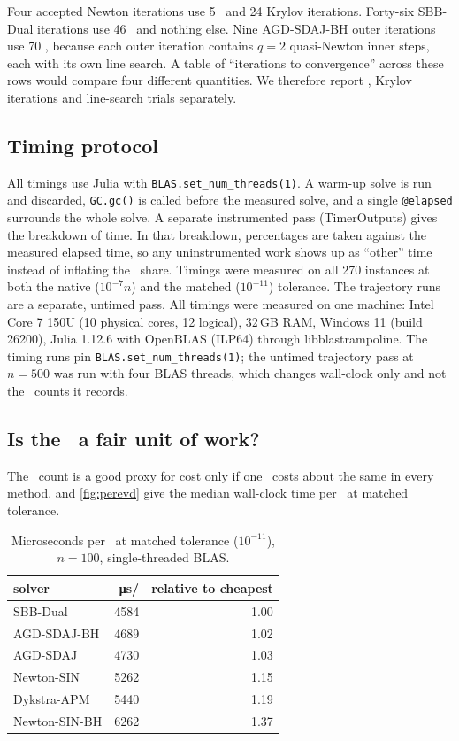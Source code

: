 Four accepted Newton iterations use 5 \EVDs\ and 24 Krylov iterations. Forty-six
SBB-Dual iterations use 46 \EVDs\ and nothing else. Nine AGD-SDAJ-BH outer
iterations use 70 \EVDs, because each outer iteration contains $q=2$
quasi-Newton inner steps, each with its own line search. A table of
``iterations to convergence'' across these rows would compare four
different quantities. We therefore report \EVDs, Krylov iterations and
line-search trials separately.

\subsection{Timing protocol}\label{sec:timing}
All timings use Julia with \texttt{BLAS.set\_num\_threads(1)}. A warm-up solve
is run and discarded, \texttt{GC.gc()} is called before the measured solve,
and a single \texttt{@elapsed} surrounds the whole solve. A separate
instrumented pass (TimerOutputs) gives the breakdown of time. In that
breakdown, percentages are taken against the measured elapsed time, so any
uninstrumented work shows up as ``other'' time instead of inflating the
\EVD\ share. Timings were measured on all 270 instances at both the native
($10^{-7}n$) and the matched ($10^{-11}$) tolerance. The trajectory runs are
a separate, untimed pass.
All timings were measured on one machine: Intel Core 7 150U (10 physical
cores, 12 logical), 32\,GB RAM, Windows 11 (build 26200), Julia 1.12.6 with
OpenBLAS (ILP64) through libblastrampoline. The timing runs pin
\texttt{BLAS.set\_num\_threads(1)}; the untimed trajectory pass at $n=500$ was
run with four BLAS threads, which changes wall-clock only and not the \EVD\
counts it records.

\subsection{Is the \EVD\ a fair unit of work?}\label{sec:evd-unit}
The \EVD\ count is a good proxy for cost only if one \EVD\ costs about the same
in every method. \Cref{tab:perevd} and \cref{fig:perevd} give the median
wall-clock time per \EVD\ at matched tolerance.

\begin{table}[t]
\centering
\caption{Microseconds per \EVD\ at matched tolerance ($10^{-11}$), $n=100$,
single-threaded BLAS.}
\label{tab:perevd}
\begin{tabular}{lrr}
\toprule
solver & \si{\micro\second}/\EVD & relative to cheapest\\
\midrule
SBB-Dual      & 4584 & 1.00\\
AGD-SDAJ-BH   & 4689 & 1.02\\
AGD-SDAJ      & 4730 & 1.03\\
Newton-SIN    & 5262 & 1.15\\
Dykstra-APM   & 5440 & 1.19\\
Newton-SIN-BH & 6262 & 1.37\\
\bottomrule
\end{tabular}
\end{table}

